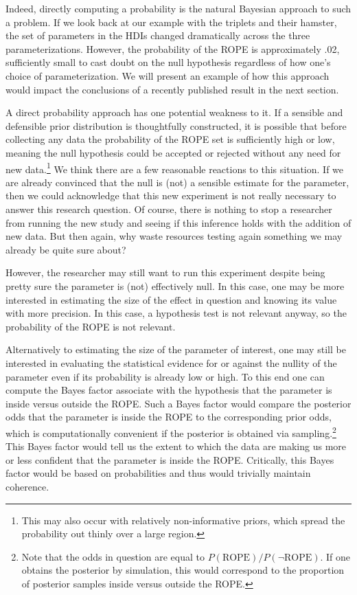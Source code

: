 \documentclass[man]{apa}
\begin{document}
Indeed, directly computing a probability is the natural Bayesian approach to such a problem. If we look back at our example with the triplets and their hamster, the set of parameters in the HDIs changed dramatically across the three parameterizations. However, the probability of the ROPE is approximately .02, sufficiently small to cast doubt on the null hypothesis regardless of how one's choice of parameterization.
We will present an example of how this approach would impact the conclusions of a recently published result in the next section.

A direct probability approach has one potential weakness to it. If a sensible and defensible prior distribution is thoughtfully constructed, it is possible that before collecting any data the probability of the ROPE set is sufficiently high or low, meaning the null hypothesis could be accepted or rejected without any need for new data.\footnote{This may also occur with relatively non-informative priors, which spread the probability out thinly over a large region.} We think there are a few reasonable reactions to this situation. If we are already convinced that the null is (not) a sensible estimate for the parameter, then we could acknowledge that this new experiment is not really necessary to answer this research question. Of course, there is nothing to stop a researcher from running the new study and seeing if this inference holds with the addition of new data. But then again, why waste resources testing again something we may already be quite sure about? 

However, the researcher may still want to run this experiment despite being pretty sure the parameter is (not) effectively null. In this case, one may be more interested in estimating the size of the effect in question and knowing its value with more precision. In this case, a hypothesis test is not relevant anyway, so the probability of the ROPE is not relevant. 

Alternatively to estimating the size of the parameter of interest, one may still be interested in evaluating the statistical evidence for or against the nullity of the parameter even if its probability is already low or high. To this end one can compute the Bayes factor associate with the hypothesis that the parameter is inside versus outside the ROPE. Such a Bayes factor would compare the posterior odds that the parameter is inside the ROPE to the corresponding prior odds, which is computationally convenient if the posterior is obtained via sampling.\footnote{Note that the odds in question are equal to $P(\text{ROPE})/P(\lnot \text{ROPE})$. If one obtains the posterior by simulation, this would correspond to the proportion of posterior samples inside versus outside the ROPE.} This Bayes factor would tell us the extent to which the data are making us more or less confident that the parameter is inside the ROPE. Critically, this Bayes factor would be based on probabilities and thus would trivially maintain coherence.
\end{document}
